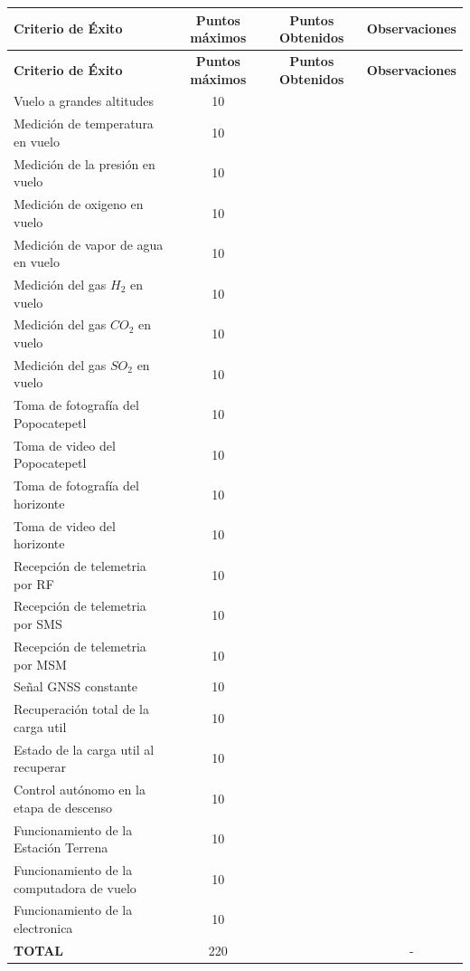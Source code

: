 \documentclass[letterpaper,12pt]{article} %
\begin{document}
    \begin{longtable}{|m{4.1cm}|c|c|c|}
    \hline
    \textbf{Criterio de Éxito} & \textbf{Puntos máximos} & \textbf{Puntos Obtenidos} & \textbf{Observaciones} \\
    \hline
    \endfirsthead
    \hline
    \textbf{Criterio de Éxito} & \textbf{Puntos máximos} & \textbf{Puntos Obtenidos} & \textbf{Observaciones} \\
    \hline
    \endhead
    Vuelo a grandes altitudes & 10 &  & \\
    \midrule
    Medición de temperatura en vuelo & 10 &  & \\
    \midrule
    Medición de la presión en vuelo & 10 &  & \\
    \midrule
    Medición de oxigeno en vuelo & 10 &  & \\
    \midrule
    Medición de vapor de agua en vuelo & 10 &  & \\
    \midrule
    Medición del gas $H_{2}$ en vuelo & 10 &  & \\
    \midrule
    Medición del gas $CO_{2}$ en vuelo & 10 &  & \\
    \midrule
    Medición del gas $SO_{2}$ en vuelo & 10 &  & \\
    \midrule
    Toma de fotografía del Popocatepetl & 10 &  & \\
    \midrule
    Toma de video del Popocatepetl & 10 &  & \\
    \midrule
    Toma de fotografía del horizonte & 10 &  & \\
    \midrule
    Toma de video del horizonte & 10 &  & \\
    \midrule
    Recepción de telemetria por RF & 10 &  & \\
    \midrule
    Recepción de telemetria por SMS & 10 &  & \\
    \midrule
    Recepción de telemetria por MSM & 10 &  & \\
    \midrule
    Señal GNSS constante & 10 &  & \\
    \midrule
    Recuperación total de la carga util & 10 &  & \\
    \midrule
    Estado de la carga util al recuperar & 10 &  & \\
    \midrule
    Control autónomo en la etapa de descenso & 10 & & \\
    \midrule
    Funcionamiento de la Estación Terrena & 10 &  & \\
    \midrule
    Funcionamiento de la computadora de vuelo & 10 &  & \\
    \midrule
    Funcionamiento de la electronica & 10 &  & \\
    \midrule
    \textbf{TOTAL} & 220 &  & -\\
    \hline
    \end{longtable}
\end{document}
